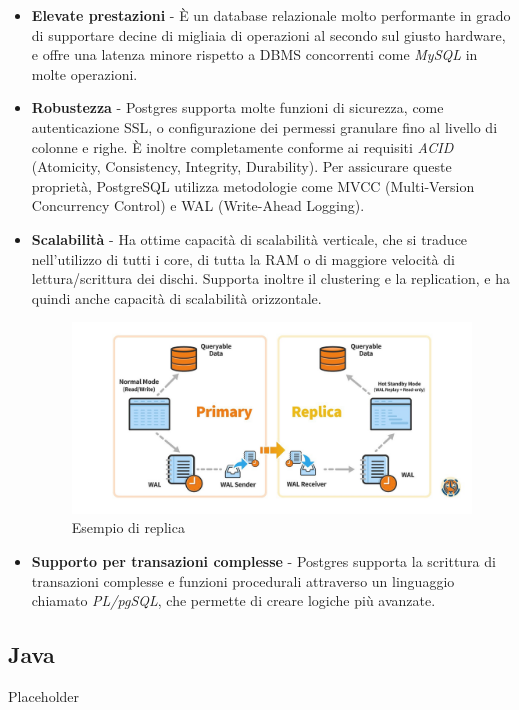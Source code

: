 \begin{itemize}
  \item \textbf{Elevate prestazioni} - \`E un database relazionale molto performante in grado di supportare decine di migliaia di operazioni al secondo sul giusto hardware,
    e offre una latenza minore rispetto a DBMS concorrenti come \textit{MySQL} in molte operazioni.\cite{salunke2024performance}
  \item \textbf{Robustezza} - Postgres supporta molte funzioni di sicurezza, come autenticazione SSL, o configurazione dei permessi granulare fino al
    livello di colonne e righe.
    \`E inoltre completamente conforme ai requisiti \textit{ACID} (Atomicity, Consistency, Integrity, Durability).
    Per assicurare queste propriet\`a, PostgreSQL utilizza metodologie come MVCC (Multi-Version Concurrency Control) e WAL (Write-Ahead Logging).
  \item \textbf{Scalabilit\`a} - Ha ottime capacit\`a di scalabilit\`a verticale, che si traduce nell'utilizzo di tutti i core,
    di tutta la RAM o di maggiore velocit\`a di lettura/scrittura dei dischi.
    Supporta inoltre il clustering e la replication, e ha quindi anche capacit\`a di scalabilit\`a orizzontale.
    \begin{figure}[H]
      \centering
      \includegraphics[width=15cm]{images/postgres-replication.png}
      \caption{Esempio di replica\cite{postgreshighavail}}
    \end{figure}
  \item \textbf{Supporto per transazioni complesse} - Postgres supporta la scrittura di transazioni complesse e funzioni procedurali attraverso un linguaggio chiamato
    \textit{PL/pgSQL}, che permette di creare logiche pi\`u avanzate.
\end{itemize}

\subsection{Java}
Placeholder
